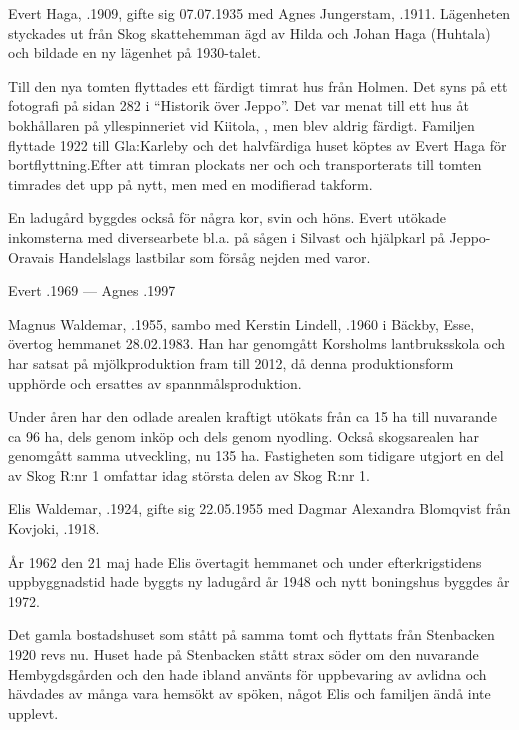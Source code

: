 Evert Haga, .1909, gifte sig 07.07.1935  med Agnes Jungerstam, .1911. Lägenheten styckades ut från Skog skattehemman ägd av Hilda och Johan Haga (Huhtala) och bildade en  ny lägenhet på 1930-talet.

Till den nya tomten flyttades ett färdigt timrat hus från Holmen. Det syns på ett fotografi på sidan 282 i ``Historik över Jeppo''. Det var menat till ett hus åt bokhållaren på yllespinneriet vid Kiitola, , men blev aldrig färdigt. Familjen flyttade 1922 till Gla:Karleby och det halvfärdiga huset köptes av Evert Haga för bortflyttning.Efter att timran plockats ner och och transporterats till tomten timrades det upp på nytt, men med en modifierad takform.

En ladugård byggdes också för några kor, svin och höns. Evert utökade inkomsterna med diversearbete bl.a. på sågen i Silvast och hjälpkarl på Jeppo-Oravais Handelslags lastbilar som försåg nejden med varor.

Evert .1969   ---    Agnes .1997






Magnus Waldemar, .1955, sambo med Kerstin Lindell, .1960 i Bäckby, Esse, övertog hemmanet 28.02.1983. Han har genomgått Korsholms lantbruksskola och har satsat på mjölkproduktion fram till 2012, då denna produktionsform upphörde och ersattes av spannmålsproduktion.

Under åren har den odlade arealen kraftigt utökats från ca 15 ha till nuvarande ca 96 ha, dels genom inköp och dels genom nyodling. Också skogsarealen har genomgått samma utveckling, nu 135 ha. Fastigheten som tidigare utgjort en del av Skog R:nr 1 omfattar idag största delen av Skog R:nr 1.

Elis Waldemar, .1924, gifte sig 22.05.1955 med Dagmar Alexandra Blomqvist från Kovjoki, .1918.

År 1962 den 21 maj hade Elis övertagit hemmanet och under efterkrigstidens uppbyggnadstid hade byggts ny ladugård år 1948 och nytt boningshus byggdes år 1972.

Det gamla bostadshuset som stått på samma tomt och flyttats från Stenbacken 1920 revs nu. Huset hade på Stenbacken stått strax söder om den nuvarande Hembygdsgården och den hade ibland använts för uppbevaring av avlidna och hävdades av många vara hemsökt av spöken, något Elis och familjen ändå inte upplevt.

